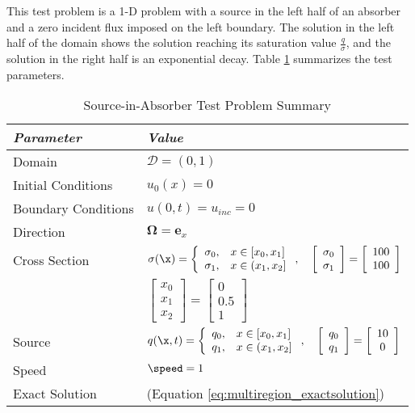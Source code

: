 This test problem is a 1-D problem with a source in the left half of an
absorber and a zero incident flux imposed on the left boundary. The solution
in the left half of the domain shows the solution reaching its
saturation value $\frac{q}{\sigma}$, and the solution in the right half
is an exponential decay.
Table \ref{tab:source_in_absorber} summarizes the test parameters.

\begin{table}[htb]\caption{Source-in-Absorber Test Problem Summary}
\label{tab:source_in_absorber}
\centering
\begin{tabular}{l l}\toprule
\emph{Parameter} & \emph{Value}\\\midrule
Domain & $\mathcal{D} = (0,1)$\\
Initial Conditions & $u_0(x)=0$\\
Boundary Conditions & $u(0,t)=u_{inc}=0$\\
Direction & $\mathbf{\Omega} = \mathbf{e}_x$\\
Cross Section & $\sigma(\x)=\left\{\begin{array}{c l}
   \sigma_0, & x\in[x_0,x_1]\\
   \sigma_1, & x\in(x_1,x_2]
   \end{array}\right.,\quad
   \left[\begin{array}{c}\sigma_0\\\sigma_1\end{array}\right] =
      \left[\begin{array}{c}100\\100\end{array}\right]$\\
   & $\left[\begin{array}{c}x_0\\x_1\\x_2\end{array}\right] =
      \left[\begin{array}{c}0\\0.5\\1\end{array}\right]$\\
Source & $q(\x,t)=\left\{\begin{array}{c l}
   q_0, & x\in[x_0,x_1]\\
   q_1, & x\in(x_1,x_2]
   \end{array}\right.,\quad
   \left[\begin{array}{c}q_0\\q_1\end{array}\right] =
      \left[\begin{array}{c}10\\0\end{array}\right]$\\
Speed & $\speed=1$\\
Exact Solution & (Equation \eqref{eq:multiregion_exactsolution})\\
\bottomrule\end{tabular}
\end{table}

